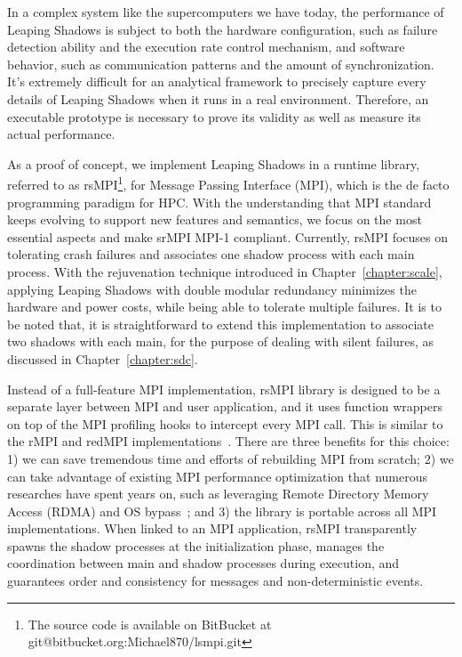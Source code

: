 In a complex system like the supercomputers we have today, the performance of Leaping Shadows is subject to both the hardware configuration, such as failure detection ability and the execution rate control mechanism, and software behavior, such as communication patterns and the amount of synchronization. 
It's extremely difficult for an analytical framework to precisely capture every details of Leaping Shadows when it runs in a real environment. Therefore, an executable prototype is necessary to prove its validity as well as measure its actual performance. 

As a proof of concept, we implement Leaping Shadows in a runtime library, referred to as rsMPI\footnote{The source code is available on BitBucket at git@bitbucket.org:Michael870/lsmpi.git}, for Message Passing Interface (MPI), which is the de facto programming paradigm for HPC. With the understanding that MPI standard keeps evolving to support new features and semantics, we focus on the most essential aspects and make srMPI MPI-1 compliant. %
Currently, rsMPI focuses on tolerating crash failures and associates one shadow process with each main process. %
With the rejuvenation technique introduced in Chapter~\ref{chapter:scale}, applying Leaping Shadows with double modular redundancy minimizes the hardware and power costs, while being able to tolerate multiple failures. It is to be noted that, it is straightforward to extend this implementation to associate two shadows with each main, for the purpose of dealing with silent failures, as discussed in Chapter~\ref{chapter:sdc}. 


Instead of a full-feature MPI implementation, rsMPI library is designed to be a separate layer between MPI and user application, and it uses function wrappers on top of the MPI profiling hooks to intercept every MPI call. This is similar to the rMPI and redMPI implementations~\cite{ferreira_sc_2011,fiala_2012_sdc}. There are three benefits for this choice: 1) we can save tremendous time and efforts of rebuilding MPI from scratch; 2) we can take advantage of existing MPI performance optimization that numerous researches have spent years on, such as leveraging Remote Directory
Memory Access (RDMA) and OS bypass~\cite{woodall2006high}; and 3) the library is portable across all MPI implementations. 
When linked to an MPI application, rsMPI transparently spawns the shadow processes at the initialization phase, manages the coordination between main and shadow processes during execution, and guarantees order and consistency for messages and non-deterministic events.


